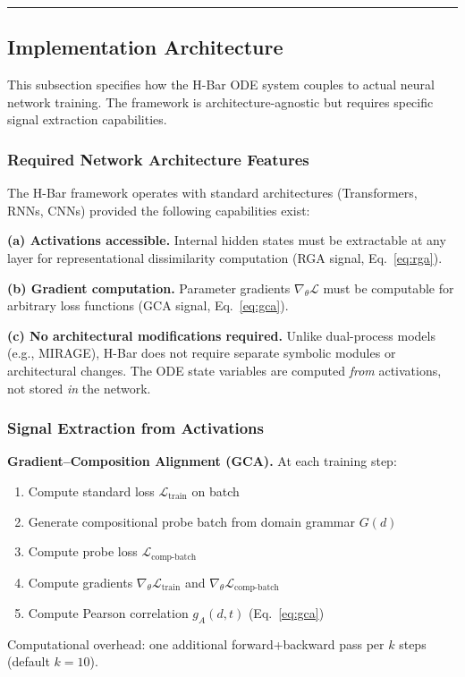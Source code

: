 \documentclass[11pt,a4paper]{article}
\begin{document}
\noindent\rule{\linewidth}{0.4pt}

\subsection{Implementation Architecture}\label{sec:implementation}

This subsection specifies how the H-Bar ODE system couples to actual
neural network training. The framework is architecture-agnostic but
requires specific signal extraction capabilities.

\subsubsection{Required Network Architecture Features}

The H-Bar framework operates with standard architectures (Transformers,
RNNs, CNNs) provided the following capabilities exist:

\textbf{(a) Activations accessible.} Internal hidden states must be
extractable at any layer for representational dissimilarity computation
(RGA signal, Eq.~\ref{eq:rga}).

\textbf{(b) Gradient computation.} Parameter gradients $\nabla_\theta
\mathcal{L}$ must be computable for arbitrary loss functions (GCA signal,
Eq.~\ref{eq:gca}).

\textbf{(c) No architectural modifications required.} Unlike dual-process
models (e.g., MIRAGE), H-Bar does not require separate symbolic modules
or architectural changes. The ODE state variables are computed \textit{from}
activations, not stored \textit{in} the network.

\subsubsection{Signal Extraction from Activations}

\textbf{Gradient--Composition Alignment (GCA).} At each training step:
\begin{enumerate}[nosep]
\item Compute standard loss $\mathcal{L}_{\text{train}}$ on batch
\item Generate compositional probe batch from domain grammar $G(d)$
\item Compute probe loss $\mathcal{L}_{\text{comp-batch}}$
\item Compute gradients $\nabla_\theta \mathcal{L}_{\text{train}}$ and $\nabla_\theta \mathcal{L}_{\text{comp-batch}}$
\item Compute Pearson correlation $g_A(d,t)$ (Eq.~\ref{eq:gca})
\end{enumerate}
Computational overhead: one additional forward+backward pass per $k$ steps
(default $k=10$).
\end{document}
